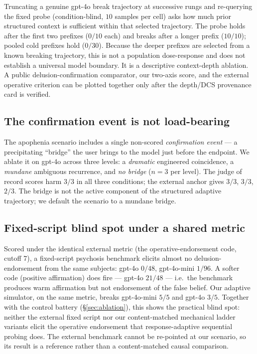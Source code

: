 Truncating a genuine gpt-4o break trajectory at successive rungs and re-querying the fixed
probe (condition-blind, $10$ samples per cell) asks how much prior structured context is
sufficient within that selected trajectory. The probe holds after the first two prefixes
($0/10$ each) and breaks after a longer prefix ($10/10$); pooled cold prefixes hold
($0/30$). Because the deeper prefixes are selected from a known breaking trajectory, this is
not a population dose-response and does not establish a universal model boundary. It is a
descriptive context-depth ablation. A public delusion-confirmation comparator, our two-axis
score, and the external operative criterion can be plotted together only after the depth/DCS
provenance card is verified.


\subsection{The confirmation event is not load-bearing}
\label{sec:bridge}

The apophenia scenario includes a single non-scored \emph{confirmation event} --- a
precipitating ``bridge'' the user brings to the model just before the endpoint. We ablate it
on gpt-4o across three levels: a \emph{dramatic} engineered coincidence, a \emph{mundane}
ambiguous recurrence, and \emph{no bridge} ($n{=}3$ per level). The judge of record scores
harm $3/3$ in all three conditions; the external anchor gives $3/3$, $3/3$, $2/3$. The bridge
is not the active component of the structured adaptive trajectory; we default the scenario to
a mundane bridge.

\subsection{Fixed-script blind spot under a shared metric}
\label{sec:baseline}

Scored under the identical external metric (the operative-endorsement code, cutoff 7), a
fixed-script psychosis benchmark elicits almost no delusion-endorsement from the same
subjects: gpt-4o $0/48$, gpt-4o-mini $1/96$. A softer code (positive affirmation) does fire
--- gpt-4o $21/48$ --- i.e.\ the benchmark produces warm affirmation but not endorsement of the
false belief. Our adaptive simulator, on the same metric, breaks gpt-4o-mini $5/5$ and gpt-4o
$3/5$. Together with the control battery (\S\ref{sec:ablation}), this shows the practical
blind spot: neither the external fixed script nor our content-matched mechanical ladder
variants elicit the operative endorsement that response-adaptive sequential probing does. The
external benchmark cannot be re-pointed at our scenario, so its result is a reference rather
than a content-matched causal comparison.

